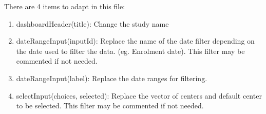 \documentclass[]{article}
\newenvironment{Shaded}{\begin{snugshade}}{\end{snugshade}}
\newcommand{\CommentTok}[1]{\textcolor[rgb]{0.56,0.35,0.01}{\textit{#1}}}
\newcommand{\ControlFlowTok}[1]{\textcolor[rgb]{0.13,0.29,0.53}{\textbf{#1}}}
\newcommand{\DataTypeTok}[1]{\textcolor[rgb]{0.13,0.29,0.53}{#1}}
\newcommand{\DecValTok}[1]{\textcolor[rgb]{0.00,0.00,0.81}{#1}}
\newcommand{\KeywordTok}[1]{\textcolor[rgb]{0.13,0.29,0.53}{\textbf{#1}}}
\newcommand{\NormalTok}[1]{#1}
\newcommand{\OperatorTok}[1]{\textcolor[rgb]{0.81,0.36,0.00}{\textbf{#1}}}
\newcommand{\StringTok}[1]{\textcolor[rgb]{0.31,0.60,0.02}{#1}}
\providecommand{\tightlist}{%
  \setlength{\itemsep}{0pt}\setlength{\parskip}{0pt}}
\begin{document}
\begin{Shaded}
\end{Shaded}

There are 4 items to adapt in this file:

\begin{enumerate}
\def\labelenumi{\arabic{enumi}.}
\tightlist
\item
  dashboardHeader(title): Change the study name
\item
  dateRangeInput(inputId): Replace the name of the date filter depending
  on the date used to filter the data. (eg. Enrolment date). This filter
  may be commented if not needed.
\item
  dateRangeInput(label): Replace the date ranges for filtering.
\item
  selectInput(choices, selected): Replace the vector of centers and
  default center to be selected. This filter may be commented if not
  needed.
\end{enumerate}
\end{document}
